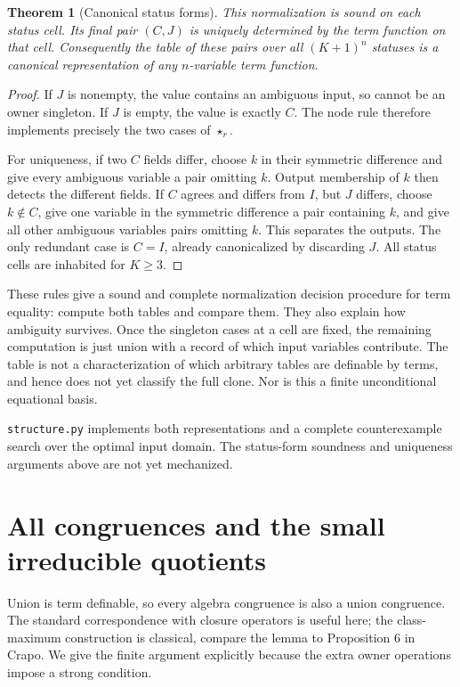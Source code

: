 \documentclass[11pt]{article}
\newtheorem{theorem}{Theorem}[section]
\begin{document}
\begin{theorem}[Canonical status forms]\label{thm:normal}
This normalization is sound on each status cell. Its final pair $(C,J)$
is uniquely determined by the term function on that cell. Consequently
the table of these pairs over all $(K+1)^n$ statuses is a canonical
representation of any $n$-variable term function.
\end{theorem}
\begin{proof}
If $J$ is nonempty, the value contains an ambiguous input, so cannot be
an owner singleton. If $J$ is empty, the value is exactly $C$. The node
rule therefore implements precisely the two cases of $\star_r$.

For uniqueness, if two $C$ fields differ, choose $k$ in their symmetric
difference and give every ambiguous variable a pair omitting $k$.
Output membership of $k$ then detects the different fields. If $C$
agrees and differs from $I$, but $J$ differs, choose $k\notin C$, give one
variable in the symmetric difference a pair containing $k$, and give all
other ambiguous variables pairs omitting $k$. This separates the
outputs. The only redundant case is $C=I$, already canonicalized by
discarding $J$. All status cells are inhabited for $K\geq3$.
\end{proof}

These rules give a sound and complete normalization decision procedure for term
equality: compute both tables and compare them. They also explain how
ambiguity survives. Once the singleton cases at a cell are fixed, the
remaining computation is just union with a record of which input
variables contribute. The table is not a characterization of which
arbitrary tables are definable by terms, and hence does not yet classify
the full clone. Nor is this a finite unconditional equational basis.

\texttt{structure.py} implements both representations and a complete
counterexample search over the optimal input domain. The status-form
soundness and uniqueness arguments above are not yet mechanized.

\section{All congruences and the small irreducible quotients}

Union is term definable, so every algebra congruence is also a union
congruence. The standard correspondence with closure operators is useful
here; the class-maximum construction is classical, compare the lemma to
Proposition 6 in Crapo\cite{Crapo1967}. We give the finite argument
explicitly because the extra owner operations impose a strong condition.
\end{document}
